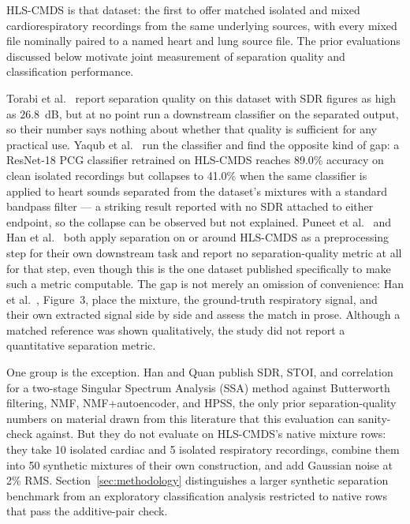 \documentclass[journal]{IEEEtran}
\begin{document}
HLS-CMDS \cite{torabi_descriptor} is that dataset: the first to offer matched isolated and mixed cardiorespiratory recordings from the same underlying sources, with every mixed file nominally paired to a named heart and lung source file. The prior evaluations discussed below motivate joint measurement of separation quality and classification performance.

Torabi et al.\ \cite{torabi_diss} report separation quality on this dataset with SDR figures as high as 26.8~dB, but at no point run a downstream classifier on the separated output, so their number says nothing about whether that quality is sufficient for any practical use. Yaqub et al.\ \cite{yaqub2025} run the classifier and find the opposite kind of gap: a ResNet-18 PCG classifier retrained on HLS-CMDS reaches 89.0\% accuracy on clean isolated recordings but collapses to 41.0\% when the same classifier is applied to heart sounds separated from the dataset's mixtures with a standard bandpass filter --- a striking result reported with no SDR attached to either endpoint, so the collapse can be observed but not explained. Puneet et al.\ \cite{puneet2025} and Han et al.\ \cite{han2026} both apply separation on or around HLS-CMDS as a preprocessing step for their own downstream task and report no separation-quality metric at all for that step, even though this is the one dataset published specifically to make such a metric computable. The gap is not merely an omission of convenience: Han et al.\ \cite{han2026}, Figure~3, place the mixture, the ground-truth respiratory signal, and their own extracted signal side by side and assess the match in prose. Although a matched reference was shown qualitatively, the study did not report a quantitative separation metric.

One group is the exception. Han and Quan \cite{han_quan_ssa} publish SDR, STOI, and correlation for a two-stage Singular Spectrum Analysis (SSA) method against Butterworth filtering, NMF, NMF+autoencoder, and HPSS, the only prior separation-quality numbers on material drawn from this literature that this evaluation can sanity-check against. But they do not evaluate on HLS-CMDS's native mixture rows: they take 10 isolated cardiac and 5 isolated respiratory recordings, combine them into 50 synthetic mixtures of their own construction, and add Gaussian noise at 2\% RMS. Section~\ref{sec:methodology} distinguishes a larger synthetic separation benchmark from an exploratory classification analysis restricted to native rows that pass the additive-pair check.
\end{document}
